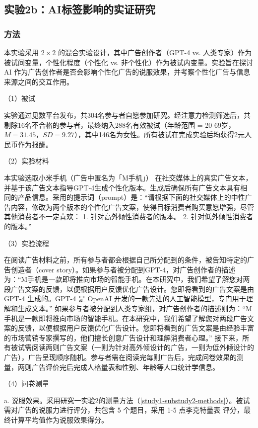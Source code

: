 \subsection{实验2b：AI标签影响的实证研究}
\subsubsection{方法}

本实验采用 $2 \times 2$ 的混合实验设计，其中广告创作者（GPT-4 vs. 人类专家）作为被试间变量，个性化程度（个性化 vs. 非个性化）作为被试内变量。实验旨在探讨 AI 作为广告创作者是否会影响个性化广告的说服效果，并考察个性化广告与信息来源之间的交互作用。


（1）被试

实验通过见数平台发布，共304名参与者自愿参加研究。经注意力检测筛选后，共剔除16名不合格的参与者，最终纳入288名有效被试（年龄范围 = 20-69岁，$\textit{M} = 31.45$，$\textit{SD} = 9.27$），其中146名为女性。所有被试在完成实验后均获得2元人民币作为报酬。

（2）实验材料

本实验选取小米手机（广告中匿名为「M手机」） 在社交媒体上的真实广告文本，并基于该广告文本指导GPT-4生成个性化版本。生成后确保所有广告文本具有相同的产品信息。采用的提示词（prompt）是：“请根据下面的社交媒体上的中性广告内容，修改为两个版本的个性化广告文案，使得目标消费者购买意愿增强，尽管其他消费者不一定喜欢：
1. 针对高外倾性消费者的版本。
2. 针对低外倾性消费者的版本。”

（3）实验流程

在阅读广告材料之前，所有参与者都会根据自己所分配到的条件，被告知特定的广告创造者（cover story）。如果参与者被分配到GPT-4，对广告创作者的描述为：“M手机是一款即将推向市场的智能手机。在本研究中，我们希望了解您对两段广告文案的反馈，以便根据用户反馈优化广告设计。您即将看到的广告文案是由 GPT-4 生成的。GPT-4 是 OpenAI 开发的一款先进的人工智能模型，专门用于理解和生成文本。” 如果参与者被分配到人类专家组，对广告创作者的描述则为：“M 手机是一款即将推向市场的智能手机。在本研究中，我们希望了解您对两段广告文案的反馈，以便根据用户反馈优化广告设计。您即将看到的广告文案是由经验丰富的市场营销专家撰写的，他们擅长创意广告设计和理解消费者心理。” 接下来，所有被试需阅读两则广告文案（一则为针对高外倾设计的广告，一则为低外倾设计的广告），广告呈现顺序随机。参与者需在阅读完每则广告后，完成问卷效果的测量，两则广告评价完后完成人格量表和性别、年龄等人口统计学信息。

（4）问卷测量

a. 说服效果。采用研究一实验2的测量方法（\ref{study1-substudy2-methods}）。被试需对广告的说服力进行评分，共包含 5 个题目，采用 1-5 点李克特量表 评分，最终计算平均值作为说服效果得分。

